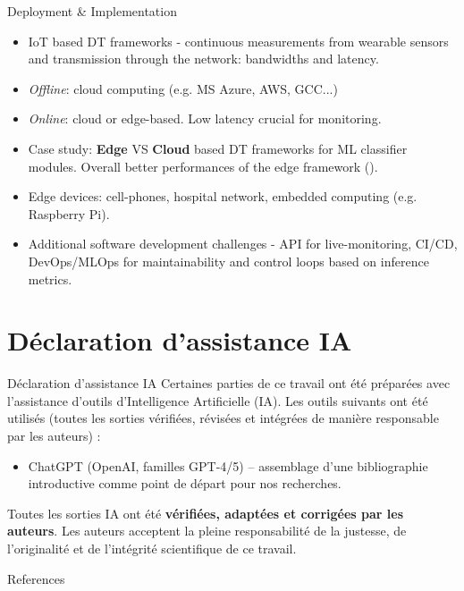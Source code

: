 \documentclass{beamer}
\begin{document}
\begin{frame}{Deployment \& Implementation}
  \begin{itemize}
    \item IoT based DT frameworks - continuous measurements from wearable sensors and transmission through the network: bandwidths and latency.
    \item \textit{Offline}: cloud computing (e.g. MS Azure, AWS, GCC...)
    \item \textit{Online}: cloud or edge-based. Low latency crucial for monitoring.
    \item Case study: \textbf{Edge} VS \textbf{Cloud} based DT frameworks for ML classifier modules. Overall better performances of the edge framework (\textcite{burak2023}).
    \item Edge devices: cell-phones, hospital network, embedded computing (e.g. Raspberry Pi).
    \item Additional software development challenges - API for live-monitoring, CI/CD, DevOps/MLOps for maintainability and control loops based on inference metrics.
  \end{itemize}
\end{frame}

\section*{Déclaration d'assistance IA}
\begin{frame}{Déclaration d'assistance IA}
  Certaines parties de ce travail ont été préparées avec l'assistance d'outils d'Intelligence Artificielle (IA). Les outils suivants ont été utilisés (toutes les sorties vérifiées, révisées et intégrées de manière responsable par les auteurs) :
  \begin{itemize}
    \item ChatGPT (OpenAI, familles GPT-4/5) – assemblage d'une bibliographie introductive comme point de départ pour nos recherches.
  \end{itemize}
  Toutes les sorties IA ont été \textbf{vérifiées, adaptées et corrigées par les auteurs}. Les auteurs acceptent la pleine responsabilité de la justesse, de l'originalité et de l'intégrité scientifique de ce travail.
\end{frame}

\begin{frame}[allowframebreaks]{References}
    \printbibliography
\end{frame}
\end{document}
